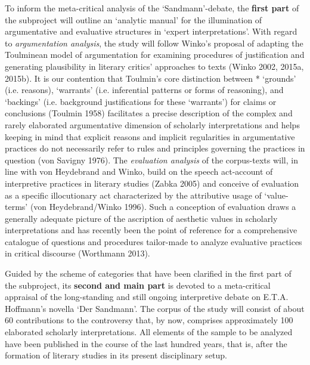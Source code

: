To inform  the meta-critical analysis of the `Sandmann'-debate, the \textbf{first part} of the subproject will outline an `analytic manual' for the illumination of argumentative and evaluative structures in `expert interpretations'. With regard to \emph{argumentation analysis}, the study will follow Winko's proposal of adapting the Toulminean model of argumentation for examining procedures of justification and generating plausibility in literary critics' approaches to texts (Winko 2002, 2015a, 2015b). It is our contention that Toulmin's core distinction between * `grounds' (i.e. reasons), `warrants' (i.e. inferential patterns or forms of reasoning), and `backings' (i.e. background justifications for these `warrants') for claims or conclusions (Toulmin 1958) facilitates a precise description of the complex and rarely elaborated argumentative dimension of scholarly interpretations and helps keeping in mind that explicit reasons and implicit regularities in argumentative practices do not necessarily refer to rules and principles governing the practices in question (von Savigny 1976). The \emph{evaluation analysis} of the corpus-texts will, in line with von Heydebrand and Winko, build on the speech act-account of interpretive practices in literary studies (Zabka 2005) and conceive of evaluation as a specific illocutionary act characterized by the attributive usage of `value-terms' (von Heydebrand/Winko 1996). Such a conception of evaluation draws a generally adequate picture of the ascription of aesthetic values in scholarly interpretations and has recently been the point of reference for a comprehensive catalogue of questions and procedures tailor-made to analyze evaluative practices in critical discourse (Worthmann 2013).


Guided by the scheme of categories that have been clarified in the first part of the subproject, its \textbf{second and main part} is devoted to a meta-critical appraisal of the long-standing and still ongoing interpretive debate on E.T.A. Hoffmann's novella `Der Sandmann'. The corpus of the study will consist of about 60 contributions to the controversy that, by now, comprises approximately 100 elaborated scholarly interpretations. All elements of the sample to be analyzed have been published in the course of the last hundred years, that is, after the formation of literary studies in its present disciplinary setup. 

